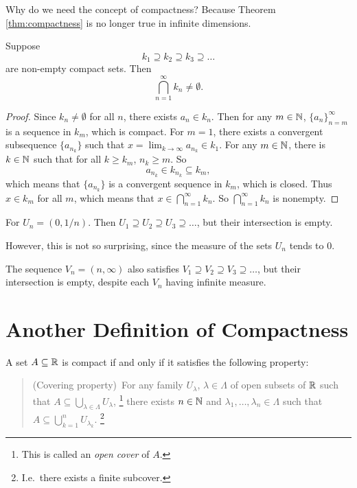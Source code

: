 \begin{remark}
  Why do we need the concept of compactness? Because Theorem
  \ref{thm:compactness} is no longer true in infinite dimensions.
\end{remark}

\begin{theorem}
  Suppose
  \[k_1 \supseteq k_2 \supseteq k_3 \supseteq \dots\]
  are non-empty compact sets. Then
  \[
    \bigcap_{n = 1}^\infty k_n \ne \emptyset
  .\]
\end{theorem}

\begin{proof}
  Since $k_n \ne \emptyset$ for all $n$, there exists
  $a_n \in k_n$. Then for any $m \in \mathbb{N}$,
  $\{a_n\}_{n = m}^\infty$ is a sequence
  in $k_m$, which is compact. For $m = 1$,
  there exists a convergent
  subsequence $\{a_{n_k}\}$ such that
  $x = \lim_{k \to \infty} a_{n_k} \in k_1$. For any
  $m \in \mathbb{N}$, there is $k \in \mathbb{N}$ such that for all
  $k \ge k_m$, $n_k \ge m$. So
  \[a_{n_k} \in k_{n_k} \subseteq k_m,\]
  which means that $\{a_{n_k}\}$ is a convergent sequence
  in $k_m$, which is closed. Thus $x \in k_m$ for all
  $m$, which means that $x \in \bigcap_{n = 1}^\infty k_n$.
  So $\bigcap_{n = 1}^\infty k_n$ is nonempty.
\end{proof}

\begin{example}
  For $U_n = (0, 1 / n)$. Then
  $U_1 \supseteq U_2 \supseteq U_3 \supseteq \dots$, but
  their intersection is empty.
\end{example}

However, this is not so surprising, since the measure of
the sets $U_n$ tends to 0.

\begin{example}
  The sequence $V_n = (n, \infty)$ also satisfies
  $V_1 \supseteq V_2 \supseteq V_3 \supseteq \dots$,
  but their intersection is empty, despite each $V_n$ having
  infinite measure.
\end{example}

\section{Another Definition of Compactness}

\begin{theorem}
  A set $A \subseteq \mathbb{R}$ is compact if and only if
  it satisfies the following property:
  \begin{quote}
    (Covering property)\,
    For any family $U_\lambda$, $\lambda \in \Lambda$ of
    open subsets of $\mathbb{R}$ such that
    $A \subseteq \bigcup_{\lambda \in \Lambda} U_\lambda$,
    \footnote{This is called an \textit{open cover} of $A$.}
    there exists $n \in \mathbb{N}$ and
    $\lambda_1, \dots, \lambda_n \in \Lambda$ such that
    $A \subseteq \bigcup_{k = 1}^n U_{\lambda_k}$.
    \footnote{I.e.~there exists a finite subcover.}
  \end{quote}
\end{theorem}


